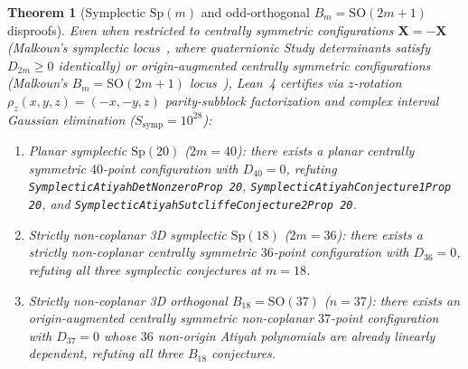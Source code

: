 \documentclass[11pt,reqno]{amsart}
\newtheorem{theorem}{Theorem}[section]
\theoremstyle{remark}
\begin{document}
\begin{theorem}[Symplectic $\mathrm{Sp}(m)$ and odd-orthogonal $B_m = \mathrm{SO}(2m+1)$ disproofs]\label{thm:main-symp}
Even when restricted to centrally symmetric configurations $\mathbf{X} = -\mathbf{X}$ (Malkoun's symplectic locus~\cite{Malkoun2014}, where quaternionic Study determinants satisfy $D_{2m} \ge 0$ identically) or origin-augmented centrally symmetric configurations (Malkoun's $B_m = \mathrm{SO}(2m+1)$ locus~\cite{Malkoun2015}), Lean~4 certifies via $z$-rotation $\rho_z(x,y,z) = (-x,-y,z)$ parity-subblock factorization and complex interval Gaussian elimination ($S_{\mathrm{symp}} = 10^{28}$):
\begin{enumerate}
  \item Planar symplectic $\mathrm{Sp}(20)$ ($2m = 40$): there exists a planar centrally symmetric $40$-point configuration with $D_{40} = 0$, refuting \texttt{Symplectic\allowbreak AtiyahDetNonzeroProp 20}, \texttt{Symplectic\allowbreak AtiyahConjecture1Prop 20}, and \texttt{Symplectic\allowbreak AtiyahSutcliffe\allowbreak Conjecture2Prop 20}.
  \item Strictly non-coplanar 3D symplectic $\mathrm{Sp}(18)$ ($2m = 36$): there exists a strictly non-coplanar centrally symmetric $36$-point configuration with $D_{36} = 0$, refuting all three symplectic conjectures at $m = 18$.
  \item Strictly non-coplanar 3D orthogonal $B_{18} = \mathrm{SO}(37)$ ($n = 37$): there exists an origin-augmented centrally symmetric non-coplanar $37$-point configuration with $D_{37} = 0$ whose $36$ non-origin Atiyah polynomials are already linearly dependent, refuting all three $B_{18}$ conjectures.
\end{enumerate}
\end{theorem}
\end{document}
